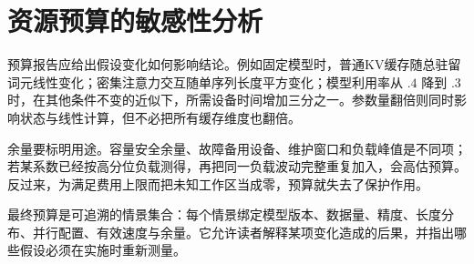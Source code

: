 \documentclass[../textbook.tex]{subfiles}
\begin{document}
\section{资源预算的敏感性分析}

预算报告应给出假设变化如何影响结论。例如固定模型时，普通KV缓存随总驻留词元线性变化；密集注意力交互随单序列长度平方变化；模型利用率从 $.4$ 降到 $.3$ 时，在其他条件不变的近似下，所需设备时间增加三分之一。参数量翻倍则同时影响状态与线性计算，但不必把所有缓存维度也翻倍。

余量要标明用途。容量安全余量、故障备用设备、维护窗口和负载峰值是不同项；若某系数已经按高分位负载测得，再把同一负载波动完整重复加入，会高估预算。反过来，为满足费用上限而把未知工作区当成零，预算就失去了保护作用。

最终预算是可追溯的情景集合：每个情景绑定模型版本、数据量、精度、长度分布、并行配置、有效速度与余量。它允许读者解释某项变化造成的后果，并指出哪些假设必须在实施时重新测量。




\chapterreferences
\myendchapterdocument
\end{document}
